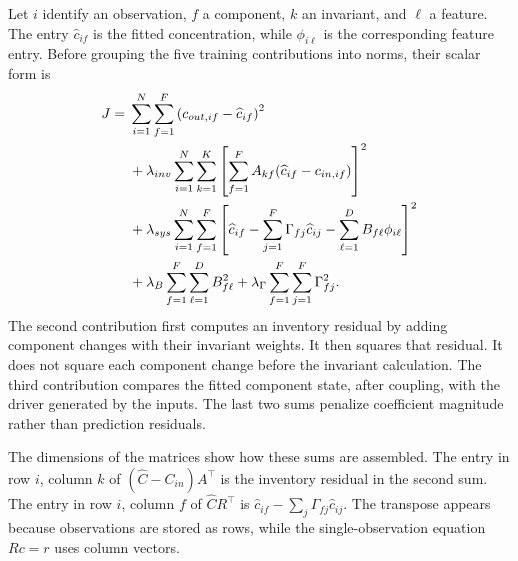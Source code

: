 Let \(i\) identify an observation, \(f\) a component, \(k\) an invariant, and \(\ell\) a feature. The entry \(\widehat c_{if}\) is the fitted concentration, while \(\phi_{i\ell}\) is the corresponding feature entry. Before grouping the five training contributions into norms, their scalar form is
\begin{equation}
\equationname{Scalar expansion of the structured-regression training objective}
\label{eq:icsor_training_scalar}
\begin{aligned}
J={}&\sum_{i=1}^{N}\sum_{f=1}^{F}
\left(c_{out,if}-\widehat c_{if}\right)^2\\
&+\lambda_{inv}\sum_{i=1}^{N}\sum_{k=1}^{K}
\left[\sum_{f=1}^{F}A_{kf}(\widehat c_{if}-c_{in,if})\right]^2\\
&+\lambda_{sys}\sum_{i=1}^{N}\sum_{f=1}^{F}
\left[\widehat c_{if}-\sum_{j=1}^{F}\Gamma_{fj}\widehat c_{ij}
-\sum_{\ell=1}^{D}B_{f\ell}\phi_{i\ell}\right]^2\\
&+\lambda_B\sum_{f=1}^{F}\sum_{\ell=1}^{D}B_{f\ell}^2
+\lambda_{\Gamma}\sum_{f=1}^{F}\sum_{j=1}^{F}\Gamma_{fj}^2.
\end{aligned}
\end{equation}
The second contribution first computes an inventory residual by adding component changes with their invariant weights. It then squares that residual. It does not square each component change before the invariant calculation. The third contribution compares the fitted component state, after coupling, with the driver generated by the inputs. The last two sums penalize coefficient magnitude rather than prediction residuals.

The dimensions of the matrices show how these sums are assembled. The entry in row \(i\), column \(k\) of \((\widehat C-C_{in})A^\top\) is the inventory residual in the second sum. The entry in row \(i\), column \(f\) of \(\widehat C R^\top\) is \(\widehat c_{if}-\sum_j\Gamma_{fj}\widehat c_{ij}\). The transpose appears because observations are stored as rows, while the single-observation equation \(Rc=r\) uses column vectors.

